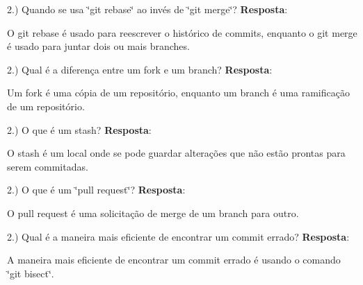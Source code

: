2.) Quando se usa \char`\"{}git rebase\char`\"{} ao invés de \char`\"{}git merge\char`\"{}? {\bfseries{Resposta}}\+:
\begin{DoxyItemize}
\item O git rebase é usado para reescrever o histórico de commits, enquanto o git merge é usado para juntar dois ou mais branches.
\end{DoxyItemize}

2.) Qual é a diferença entre um \textquotesingle{}fork\textquotesingle{} e um \textquotesingle{}branch\textquotesingle{}? {\bfseries{Resposta}}\+:
\begin{DoxyItemize}
\item Um fork é uma cópia de um repositório, enquanto um branch é uma ramificação de um repositório.
\end{DoxyItemize}

2.) O que é um \textquotesingle{}stash\textquotesingle{}? {\bfseries{Resposta}}\+:
\begin{DoxyItemize}
\item O stash é um local onde se pode guardar alterações que não estão prontas para serem commitadas.
\end{DoxyItemize}

2.) O que é um \char`\"{}pull request\char`\"{}? {\bfseries{Resposta}}\+:
\begin{DoxyItemize}
\item O pull request é uma solicitação de merge de um branch para outro.
\end{DoxyItemize}

2.) Qual é a maneira mais eficiente de encontrar um commit errado? {\bfseries{Resposta}}\+:
\begin{DoxyItemize}
\item A maneira mais eficiente de encontrar um commit errado é usando o comando \char`\"{}git bisect\char`\"{}. 
\end{DoxyItemize}